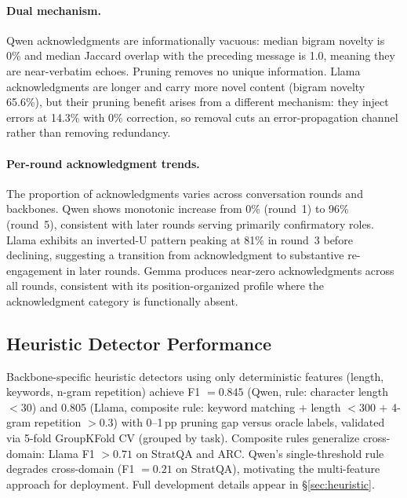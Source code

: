 \paragraph{Dual mechanism.} Qwen acknowledgments are informationally vacuous: median bigram novelty is 0\% and median Jaccard overlap with the preceding message is 1.0, meaning they are near-verbatim echoes. Pruning removes no unique information. Llama acknowledgments are longer and carry more novel content (bigram novelty 65.6\%), but their pruning benefit arises from a different mechanism: they inject errors at 14.3\% with 0\% correction, so removal cuts an error-propagation channel rather than removing redundancy.

\paragraph{Per-round acknowledgment trends.} The proportion of acknowledgments varies across conversation rounds and backbones. Qwen shows monotonic increase from 0\% (round~1) to 96\% (round~5), consistent with later rounds serving primarily confirmatory roles. Llama exhibits an inverted-U pattern peaking at 81\% in round~3 before declining, suggesting a transition from acknowledgment to substantive re-engagement in later rounds. Gemma produces near-zero acknowledgments across all rounds, consistent with its position-organized profile where the acknowledgment category is functionally absent.

\subsection{Heuristic Detector Performance}
\label{app:heuristic}

Backbone-specific heuristic detectors using only deterministic features (length, keywords, n-gram repetition) achieve F1 $= 0.845$ (Qwen, rule: character length $< 30$) and $0.805$ (Llama, composite rule: keyword matching $+$ length $< 300$ $+$ 4-gram repetition $> 0.3$) with 0--1\,pp pruning gap versus oracle labels, validated via 5-fold GroupKFold CV (grouped by task). Composite rules generalize cross-domain: Llama F1 $> 0.71$ on StratQA and ARC. Qwen's single-threshold rule degrades cross-domain (F1 $= 0.21$ on StratQA), motivating the multi-feature approach for deployment. Full development details appear in \S\ref{sec:heuristic}.
